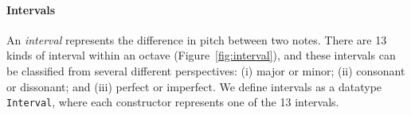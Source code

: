 \paragraph{Intervals}

\Interval

An \emph{interval} represents the difference in pitch between
two notes.
There are 13 kinds of interval within an octave
(Figure~\ref{fig:interval}), and these intervals can be classified from
several different perspectives:
(i) major or minor; (ii) consonant or dissonant; and (iii) perfect
or imperfect.
We define intervals as a datatype \texttt{Interval}, where each
constructor represents one of the 13 intervals.
